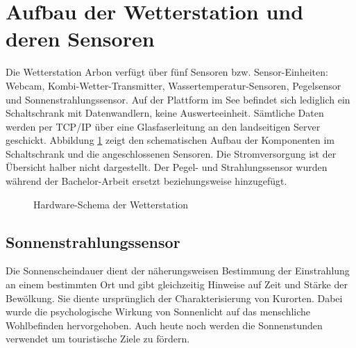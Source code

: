 \section{Aufbau der Wetterstation und deren Sensoren}
Die Wetterstation Arbon verfügt über fünf Sensoren bzw. Sensor-Einheiten: Webcam, Kombi-Wetter-Transmitter, Wassertemperatur-Sensoren, Pegelsensor und Sonnenstrahlungssensor. Auf der Plattform im See befindet sich lediglich ein Schaltschrank mit Datenwandlern, keine Auswerteeinheit. Sämtliche Daten werden per TCP/IP über eine Glasfaserleitung an den landseitigen Server geschickt. Abbildung \ref{img:schaltschrank} zeigt den schematischen Aufbau der Komponenten im Schaltschrank und die angeschlossenen Sensoren. Die Stromversorgung ist der Übersicht halber nicht dargestellt. Der Pegel- und Strahlungssensor wurden während der Bachelor-Arbeit ersetzt beziehungsweise hinzugefügt.

\begin{figure}[htbp]
	\centering
	\caption{Hardware-Schema der Wetterstation}
	\label{img:schaltschrank}
\end{figure}

\subsection{Sonnenstrahlungssensor}
Die Sonnenscheindauer dient der näherungsweisen Bestimmung der Einstrahlung an einem bestimmten Ort und gibt gleichzeitig Hinweise auf Zeit und Stärke der Bewölkung. Sie diente ursprünglich der Charakterisierung von Kurorten. Dabei wurde die psychologische Wirkung von Sonnenlicht auf das menschliche Wohlbefinden hervorgehoben. Auch heute noch werden die Sonnenstunden verwendet um touristische Ziele zu fördern.

